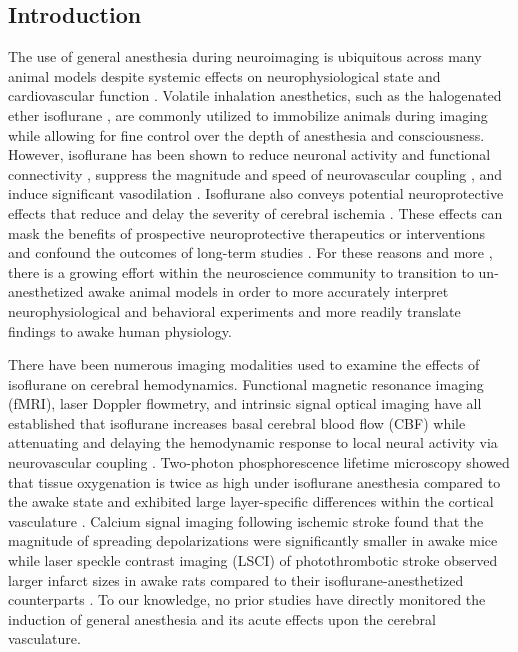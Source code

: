 \documentclass[12pt]{spieman}
\begin{document}
\begin{spacing}{2}   %


\section{Introduction}
\label{sect:introduction}

The use of general anesthesia during neuroimaging is ubiquitous across many animal models despite systemic effects on neurophysiological state and cardiovascular function \cite{Slupe:2018ea}. Volatile inhalation anesthetics, such as the halogenated ether isoflurane \cite{Eger:1981ia}, are commonly utilized to immobilize animals during imaging while allowing for fine control over the depth of anesthesia and consciousness. However, isoflurane has been shown to reduce neuronal activity \cite{Aksenov:2015ea} and functional connectivity \cite{Xie:2019de}, suppress the magnitude and speed of neurovascular coupling \cite{Masamoto:2012bj,Takuwa:2012ee,Pisauro:2013cx}, and induce significant vasodilation \cite{Koenig:1994rn,Strebel:1995uh,Iida:1998th}. Isoflurane also conveys potential neuroprotective effects that reduce and delay the severity of cerebral ischemia \cite{Kitano:2007ia,Kawaguchi:2000id,Sakai:2007wc,Li:2013ip,Lu:2017bo}. These effects can mask the benefits of prospective neuroprotective therapeutics or interventions and confound the outcomes of long-term studies \cite{Kapinya:2002ua,Seto:2014ga}. For these reasons and more \cite{Gao:2017tw}, there is a growing effort within the neuroscience community to transition to un-anesthetized awake animal models in order to more accurately interpret neurophysiological and behavioral experiments and more readily translate findings to awake human physiology.

There have been numerous imaging modalities used to examine the effects of isoflurane on cerebral hemodynamics. Functional magnetic resonance imaging (fMRI), laser Doppler flowmetry, and intrinsic signal optical imaging have all established that isoflurane increases basal cerebral blood flow (CBF) while attenuating and delaying the hemodynamic response to local neural activity via neurovascular coupling \cite{Sicard:2003dj,Desai:2011mb,Aksenov:2015ea,Takuwa:2012ee,Pisauro:2013cx}. Two-photon phosphorescence lifetime microscopy showed that tissue oxygenation is twice as high under isoflurane anesthesia compared to the awake state and exhibited large layer-specific differences within the cortical vasculature \cite{Lyons:2016bd}. Calcium signal imaging following ischemic stroke found that the magnitude of spreading depolarizations were significantly smaller in awake mice \cite{Balbi:2017cj} while laser speckle contrast imaging (LSCI) of photothrombotic stroke observed larger infarct sizes in awake rats compared to their isoflurane-anesthetized counterparts \cite{Lu:2017bo}. To our knowledge, no prior studies have directly monitored the induction of general anesthesia and its acute effects upon the cerebral vasculature.


\end{spacing}
\end{document}
